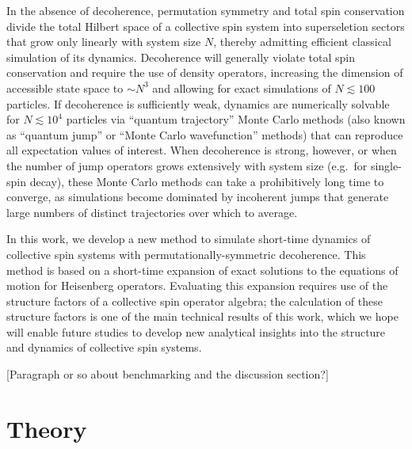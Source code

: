 \documentclass[pra,reprint,longbibliography]{revtex4-1}
\newcommand{\1}{\mathds{1}}
\begin{document}
In the absence of decoherence, permutation symmetry and total spin
conservation divide the total Hilbert space of a collective spin
system into superseletion sectors that grow only linearly with system
size $N$, thereby admitting efficient classical simulation of its
dynamics.  Decoherence will generally violate total spin conservation
and require the use of density operators, increasing the dimension of
accessible state space to $\sim N^3$\cite{hartmann2016generalized,
  xu2013simulating} and allowing for exact simulations of
$N\lesssim100$ particles.  If decoherence is sufficiently weak,
dynamics are numerically solvable for $N\lesssim10^4$ particles via
``quantum trajectory'' Monte Carlo methods\cite{plenio1998quantumjump,
  zhang2018montecarlo} (also known as ``quantum jump'' or ``Monte
Carlo wavefunction'' methods) that can reproduce all expectation
values of interest.  When decoherence is strong, however, or when the
number of jump operators grows extensively with system size (e.g.~for
single-spin decay), these Monte Carlo methods can take a prohibitively
long time to converge, as simulations become dominated by incoherent
jumps that generate large numbers of distinct trajectories over which
to average.

In this work, we develop a new method to simulate short-time dynamics
of collective spin systems with permutationally-symmetric decoherence.
This method is based on a short-time expansion of exact solutions to
the equations of motion for Heisenberg operators.  Evaluating this
expansion requires use of the structure factors of a collective spin
operator algebra; the calculation of these structure factors is one of
the main technical results of this work, which we hope will enable
future studies to develop new analytical insights into the structure
and dynamics of collective spin systems.

[Paragraph or so about benchmarking and the discussion section?]


\section{Theory}
\end{document}
